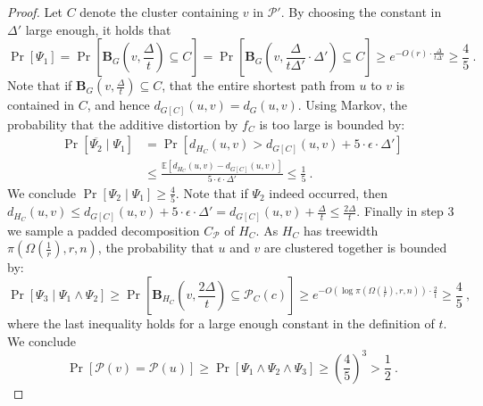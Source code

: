 \documentclass{theoretics}
\newcommand{\E}{{\mathbb{E}}}
\def\cP{\ensuremath{\mathcal{P}}}
\def\ball{\mathbf{B}}
\begin{document}
\begin{proof}
	Let $C$ denote the cluster containing $v$ in $\cP'$. By choosing the constant in $\Delta'$ large enough, it holds that 
	\[
	\Pr\left[\Psi_1\right]=\Pr\left[\ball_{G}(v,\frac{\Delta}{t})\subseteq C\right]=\Pr\left[\ball_{G}(v,\frac{\Delta}{t\Delta'}\cdot\Delta')\subseteq C\right]\ge e^{-O(r)\cdot\frac{\Delta}{t\Delta'}}\ge\frac{4}{5}~.
	\]
	Note that if $\ball_{G}(v,\frac{\Delta}{t})\subseteq C$, that the entire shortest path from $u$ to $v$ is contained in $C$, and hence $d_{G[C]}(u,v)=d_{G}(u,v)$.
	Using Markov, the probability that the additive distortion by $f_C$ is too large is bounded by:
	\begin{align*}
		\Pr\left[\overline{\Psi_{2}}\mid\Psi_{1}\right] & =\Pr\left[d_{H_{C}}(u,v)> d_{G[C]}(u,v)+5\cdot\epsilon\cdot\Delta'\right]\\
		& \le\frac{\E\left[d_{H_{C}}(u,v)-d_{G[C]}(u,v)\right]}{5\cdot\epsilon\cdot\Delta'}\le\frac{1}{5}~.
	\end{align*}
	We conclude $\Pr\left[\Psi_{2}\mid\Psi_{1}\right]\ge\frac{4}{5}$.
	Note that if $\Psi_{2}$ indeed occurred, then  $d_{H_{C}}(u,v)\le d_{G[C]}(u,v)+5\cdot\epsilon\cdot\Delta'=d_{G[C]}(u,v)+\frac{\Delta}{t}\le \frac{2\Delta}{t}$.
	Finally in step 3 we sample a padded decomposition $C_\cP$ of $H_C$. 
	As $H_C$ has treewidth $\pi(\Omega(\frac1r),r,n)$, the probability that $u$ and $v$ are clustered together is bounded by:
	\[
	\Pr\left[\Psi_{3}\mid\Psi_{1}\wedge\Psi_{2}\right]\ge\Pr\left[\ball_{H_{C}}(v,\frac{2\Delta}{t})\subseteq\cP_{C}(c)\right]\ge e^{-O(\log\pi(\Omega(\frac{1}{r}),r,n))\cdot\frac{2}{t}}\ge\frac{4}{5}~,
	\]
	where the last inequality holds for a large enough constant in the definition of $t$.
	We conclude
	\[
	\Pr\left[\cP(v)=\cP(u)\right]\ge\Pr\left[\Psi_{1}\wedge\Psi_{2}\wedge\Psi_{3}\right]\ge\left(\frac{4}{5}\right)^{3}>\frac{1}{2}~.
	\]
\end{proof}



\printbibliography
\end{document}
